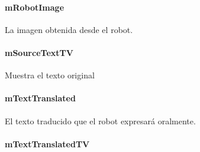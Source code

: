 \paragraph{mRobotImage}
\label{\detokenize{dev_docs:id21}}

\begin{fulllineitems}
\label{\detokenize{dev_docs:com.lar.cloudnao.OCRTranslationActivity.mRobotImage}}
La imagen obtenida desde el robot.

\end{fulllineitems}



\paragraph{mSourceTextTV}
\label{\detokenize{dev_docs:msourcetexttv}}

\begin{fulllineitems}
\label{\detokenize{dev_docs:com.lar.cloudnao.OCRTranslationActivity.mSourceTextTV}}
Muestra el texto original

\end{fulllineitems}



\paragraph{mTextTranslated}
\label{\detokenize{dev_docs:mtexttranslated}}

\begin{fulllineitems}
\label{\detokenize{dev_docs:com.lar.cloudnao.OCRTranslationActivity.mTextTranslated}}
El texto traducido que el robot expresará oralmente.

\end{fulllineitems}



\paragraph{mTextTranslatedTV}
\label{\detokenize{dev_docs:mtexttranslatedtv}}


